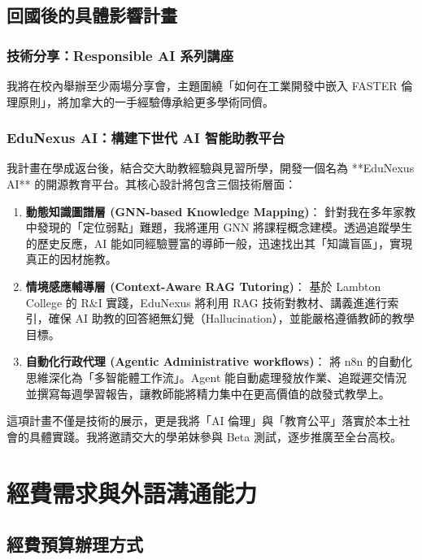 \documentclass[12pt,a4paper]{article}
\begin{document}
\subsection{回國後的具體影響計畫}

\subsubsection{技術分享：Responsible AI 系列講座}
我將在校內舉辦至少兩場分享會，主題圍繞「如何在工業開發中嵌入 FASTER 倫理原則」，將加拿大的一手經驗傳承給更多學術同儕。

\subsubsection{EduNexus AI：構建下世代 AI 智能助教平台}

我計畫在學成返台後，結合交大助教經驗與見習所學，開發一個名為 **EduNexus AI** 的開源教育平台。其核心設計將包含三個技術層面：

\begin{enumerate}
    \item \textbf{動態知識圖譜層 (GNN-based Knowledge Mapping)}：
    針對我在多年家教中發現的「定位弱點」難題，我將運用 GNN 將課程概念建模。透過追蹤學生的歷史反應，AI 能如同經驗豐富的導師一般，迅速找出其「知識盲區」，實現真正的因材施教。
    
    \item \textbf{情境感應輔導層 (Context-Aware RAG Tutoring)}：
    基於 Lambton College 的 R\&I 實踐，EduNexus 將利用 RAG 技術對教材、講義進進行索引，確保 AI 助教的回答絕無幻覺（Hallucination），並能嚴格遵循教師的教學目標。
    
    \item \textbf{自動化行政代理 (Agentic Administrative workflows)}：
    將 n8n 的自動化思維深化為「多智能體工作流」。Agent 能自動處理發放作業、追蹤遲交情況並撰寫每週學習報告，讓教師能將精力集中在更高價值的啟發式教學上。
\end{enumerate}

這項計畫不僅是技術的展示，更是我將「AI 倫理」與「教育公平」落實於本土社會的具體實踐。我將邀請交大的學弟妹參與 Beta 測試，逐步推廣至全台高校。

\newpage

\section{經費需求與外語溝通能力}

\subsection{經費預算辦理方式}
\end{document}
